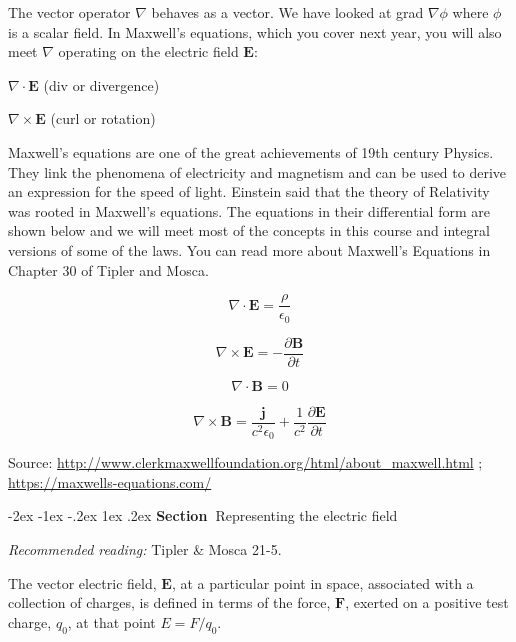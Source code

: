\documentclass[
]{book}
\makeatletter
\renewcommand\section{%
\@startsection{section}{1}{\z@}%
              {-2ex \@plus -1ex \@minus -.2ex}%
              {1ex \@plus .2ex}%
              {\sffamily\bfseries\large\noindent Section~}}
\numberwithin{equation}{section}
\makeatother
\begin{document}
The vector operator \(\nabla\) behaves as a vector. We have looked at grad
\(\nabla\phi\) where \(\phi\) is a scalar field. In Maxwell's equations,
which you cover next year, you will also meet \(\nabla\) operating on the
electric field \(\mathbf{E}\):

\(\nabla \cdot \mathbf{E}\) (div or divergence)

\(\nabla \times \mathbf{E}\) (curl or rotation)

Maxwell's equations are one of the great achievements of 19th century
Physics. They link the phenomena of electricity and magnetism and can be
used to derive an expression for the speed of light. Einstein said that
the theory of Relativity was rooted in Maxwell's equations. The
equations in their differential form are shown below and we will meet
most of the concepts in this course and integral versions of some of the
laws. You can read more about Maxwell's Equations in Chapter 30 of
Tipler and Mosca.

\begin{equation}
\label{eq:maxwell1}
\nabla \cdot \mathbf{E} = \frac{\rho}{\epsilon_0}
\end{equation}

\begin{equation}
\label{eq:maxwell2}
\nabla \times \mathbf{E} = - \frac{\partial \mathbf{B}}{\partial t} 
\end{equation}

\begin{equation}
\label{eq:maxwell3}
\nabla \cdot \mathbf{B} = 0
\end{equation}

\begin{equation}
\label{eq:maxwell4}
\nabla \times \mathbf{B} = \frac{\mathbf{j}}{c^2 \epsilon_0} + \frac{1}{c^2} \frac{\partial \mathbf{E}}{\partial t}
\end{equation}

Source: \url{http://www.clerkmaxwellfoundation.org/html/about_maxwell.html}
; \url{https://maxwells-equations.com/}

\hypertarget{representing-the-electric-field}{%
\section{Representing the electric field}\label{representing-the-electric-field}}

\emph{Recommended reading:} Tipler \& Mosca 21-5.

The vector electric field, \(\mathbf{E}\), at a particular point in space,
associated with a collection of charges, is defined in terms of the
force, \(\mathbf{F}\), exerted on a positive test charge, \(q_0\), at that point
\(E = F/q_0\).
\end{document}
